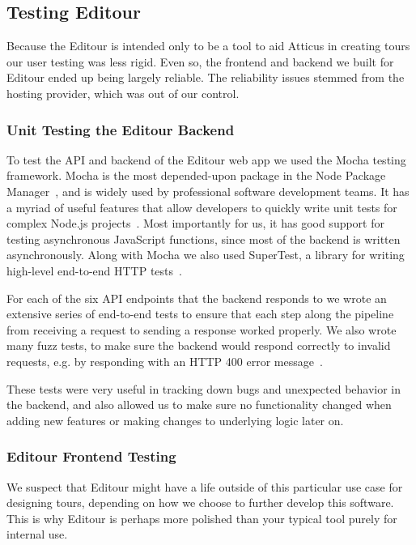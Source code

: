 \documentclass[a4paper, 10pt, american, titlepage]{article}
\begin{document}
\subsection{Testing Editour}
\label{sec:testingEditour}

Because the Editour is intended only to be a tool to aid Atticus in creating
tours our user testing was less rigid. Even so, the frontend and backend we
built for Editour ended up being largely reliable. The reliability issues
stemmed from the hosting provider, which was out of our control.

\subsubsection{Unit Testing the Editour Backend}
\label{sec:unitTestingTheEditourBackend}

To test the API and backend of the Editour web app we used the Mocha testing
framework. Mocha is the most depended-upon package in the Node Package
Manager~\autocite{tidelift2019}, and is widely used by professional software
development teams. It has a myriad of useful features that allow developers to
quickly write unit tests for complex Node.js projects~\autocite{mochajs2019}.
Most importantly for us, it has good support for testing asynchronous JavaScript
functions, since most of the backend is written asynchronously. Along with Mocha
we also used SuperTest, a library for writing high-level end-to-end HTTP
tests~\autocite{supertest2019}.

For each of the six API endpoints that the backend responds to we wrote an
extensive series of end-to-end tests to ensure that each step along the pipeline
from receiving a request to sending a response worked properly. We also wrote
many fuzz tests, to make sure the backend would respond correctly to invalid
requests, e.g. by responding with an HTTP 400 error message~\autocite{rfc7231}.

These tests were very useful in tracking down bugs and unexpected behavior in
the backend, and also allowed us to make sure no functionality changed when
adding new features or making changes to underlying logic later on.

\subsubsection{Editour Frontend Testing}
\label{sec:editourFrontendTesting}

We suspect that Editour might have a life outside of this particular use case
for designing tours, depending on how we choose to further develop this
software. This is why Editour is perhaps more polished than your typical tool
purely for internal use.
\end{document}
